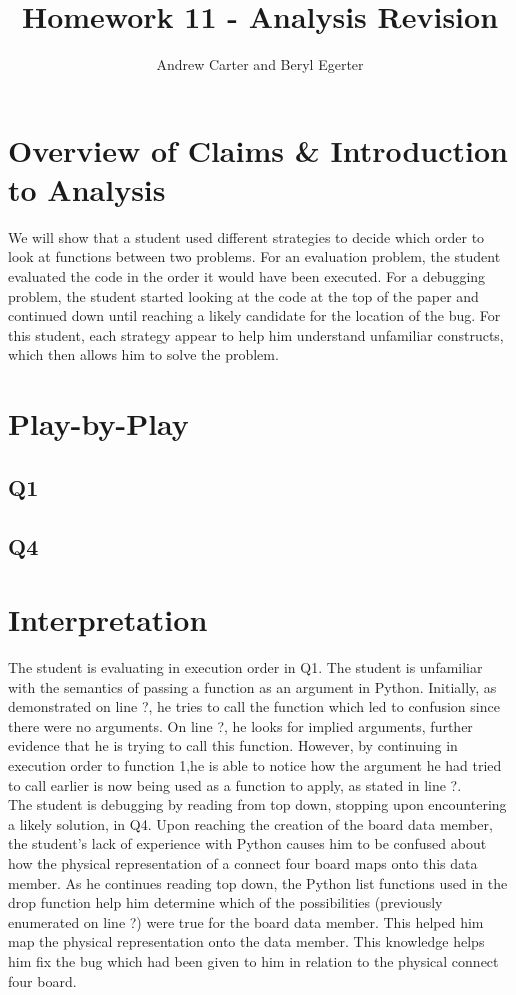 \documentclass{article}
\title{Homework 11 - Analysis Revision}
\author{Andrew Carter and Beryl Egerter}
\begin{document}
\maketitle
\section{Overview of Claims \& Introduction to Analysis}

We will show that a student used different strategies to decide which order to look at functions between two problems.
For an evaluation problem, the student evaluated the code in the order it would have been executed.
For a debugging problem, the student started looking at the code at the top of the paper and continued down until reaching a likely candidate for the location of the bug.
For this student, each strategy appear to help him understand unfamiliar constructs, which then allows him to solve the problem.

\section{Play-by-Play}
\subsection{Q1}
\subsection{Q4}

\section{Interpretation}

The student is evaluating in execution order in Q1.
The student is unfamiliar with the semantics of passing a function as an argument in Python.
Initially, as demonstrated on line ?, he tries to call the function which led to confusion since there were no arguments. On line ?, he looks for implied arguments, further evidence that he is trying to call this function.
However, by continuing in execution order to function 1,he is able to notice how the argument he had tried to call earlier is now being used as a function to apply, as stated in line ?.  \\

The student is debugging by reading from top down, stopping upon encountering a likely solution, in Q4.
Upon reaching the creation of the board data member, the student's lack of experience with Python causes him to be confused about how the physical representation of a connect four board maps onto this data member.
As he continues reading top down, the Python list functions used in the drop function help him determine which of the possibilities (previously enumerated on line ?) were true for the board data member.
This helped him map the physical representation onto the data member.
This knowledge helps him fix the bug which had been given to him in relation to the physical connect four board.  \\
\end{document}
